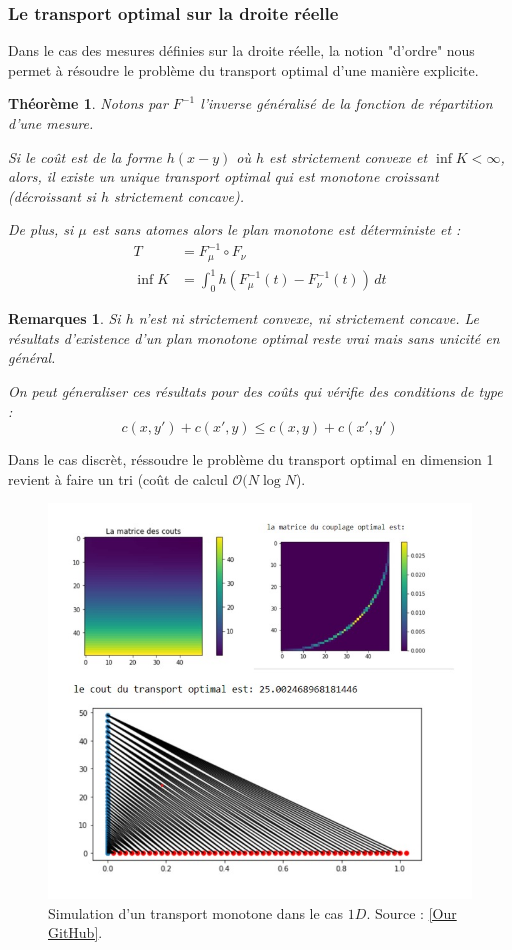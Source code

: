 \documentclass[
    8.2pt,
    a4paper,
    logo,
    twocolumn
]{template}
\newtheorem{theorem}{Théorème}
\newtheorem{remarque}{Remarques}
\renewcommand{\min}{\inf}
\begin{document}
    \subsubsection{Le transport optimal sur la droite réelle}
    Dans le cas des mesures définies sur la droite réelle, la notion "d'ordre" nous permet à résoudre le problème du transport optimal d'une manière explicite.
    \begin{theorem}
        Notons par $F^{-1}$ l'inverse généralisé de la fonction de répartition d'une mesure.

        Si le coût est de la forme $h(x-y)$ où $h$ est strictement convexe et $\inf K < \infty$, alors, il existe un unique transport optimal qui est monotone croissant (décroissant si $h$ strictement concave).

        De plus, si $\mu$ est sans atomes alors le plan monotone est déterministe et :
        \begin{align*}
            T &= F_{\mu}^{-1} \circ F_{\nu} \\
            \min{K} &= \int_{0}^{1} h \left( F_{\mu}^{-1}(t) - F_{\nu}^{-1}(t) \right) \,dt
        \end{align*}
    \end{theorem}

    \begin{remarque}
        Si $h$ n'est ni strictement convexe, ni strictement concave. Le résultats d'existence d'un plan monotone optimal reste vrai mais sans unicité en général.

        On peut géneraliser ces résultats pour des coûts qui vérifie des conditions de type :
        \[
            c(x,y') + c(x',y) \leq c(x,y) + c(x',y')
        \]
    \end{remarque}

    Dans le cas discrèt, réssoudre le problème du transport optimal en dimension 1 revient à faire un tri (coût de calcul $\mathcal{O}(N \log{N}$).

    \begin{figure}[H]
        \centering
        \includegraphics[width=.5\textwidth]{figures/image10.jpg}
        \caption{Simulation d'un transport monotone dans le cas $1D$. Source : \href{https://github.com/maranibadr/tranport-optimal/blob/master/notebooks/TO_simulation_transport.ipynb}{[Our GitHub]}.}
        \label{fig:my_label}
    \end{figure}
\end{document}

